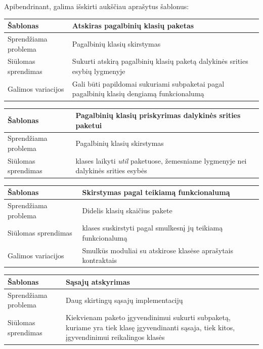 Apibendrinant, galima išskirti aukščiau aprašytus šablonus:
\begin{center}
    \begin{tabular}{|p{5cm}|p{10cm}|}
        \hline
        Šablonas &  Atskiras pagalbinių klasių paketas \\ [0.5ex]
        \hline\hline
        Sprendžiama problema & Pagalbinių klasių skirstymas\\
        \hline
        Siūlomas sprendimas & Sukurti atskirą pagalbinių klasių paketą dalykinės srities esybių lygmenyje \\
        \hline
        Galimos variacijos & Gali būti papildomai sukuriami subpaketai pagal pagalbinių klasių dengiamą funkcionalumą \\
        \hline
    \end{tabular}
    \begin{tabular}{|p{5cm}|p{10cm}|}
        \hline
        Šablonas &  Pagalbinių klasių priskyrimas dalykinės srities paketui \\ [0.5ex]
        \hline\hline
        Sprendžiama problema & Pagalbinių klasių skirstymas\\
        \hline
        Siūlomas sprendimas & klases laikyti \textit{util} paketuose, žemesniame lygmenyje nei dalykinės srities esybės \\
        \hline
    \end{tabular}
    \begin{tabular}{|p{5cm}|p{10cm}|}
        \hline
        Šablonas &  Skirstymas pagal teikiamą funkcionalumą \\ [0.5ex]
        \hline\hline
        Sprendžiama problema & Didelis klasių skaičius pakete\\
        \hline
        Siūlomas sprendimas & klases suskirstyti pagal smulkesnį jų teikiamą funkcionalumą \\
        \hline
        Galimos variacijos & Smulkūs moduliai su atskirose klasėse aprašytais kontraktais \\
        \hline
    \end{tabular}
    \begin{tabular}{|p{5cm}|p{10cm}|}
        \hline
        Šablonas &  Sąsajų atskyrimas \\ [0.5ex]
        \hline\hline
        Sprendžiama problema & Daug skirtingų sąsajų implementacijų\\
        \hline
        Siūlomas sprendimas & Kiekvienam paketo įgyvendinimui sukurti subpaketą, kuriame yra tiek klasę įgyvendinanti sąsaja, tiek kitos, įgyvendinimui reikalingos klasės \\

\end{tabular}
\end{center}
